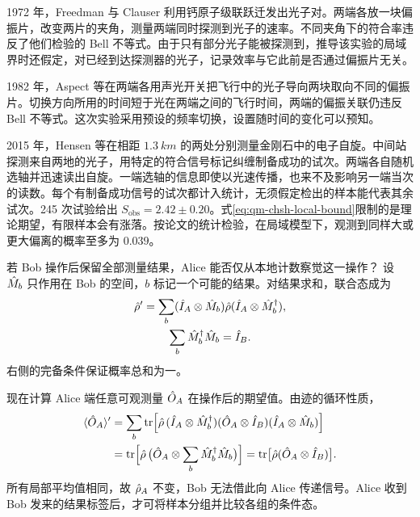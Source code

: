 \label{exp:qm-bell-1972}1972 年，Freedman 与 Clauser 利用钙原子级联跃迁发出光子对。两端各放一块偏振片，改变两片的夹角，测量两端同时探测到光子的速率。不同夹角下的符合率违反了他们检验的 Bell 不等式。由于只有部分光子能被探测到，推导该实验的局域界时还假定，对已经到达探测器的光子，记录效率与它此前是否通过偏振片无关\cite{belltests}。

\label{exp:qm-bell-1982}1982 年，Aspect 等在两端各用声光开关把飞行中的光子导向两块取向不同的偏振片。切换方向所用的时间短于光在两端之间的飞行时间，两端的偏振关联仍违反 Bell 不等式。这次实验采用预设的频率切换，设置随时间的变化可以预知\cite{belltests}。

\label{exp:qm-bell-2015}2015 年，Hensen 等在相距 $\qty{1.3}{km}$ 的两处分别测量金刚石中的电子自旋。中间站探测来自两地的光子，用特定的符合信号标记纠缠制备成功的试次。两端各自随机选轴并迅速读出自旋。一端选轴的信息即使以光速传播，也来不及影响另一端当次的读数。每个有制备成功信号的试次都计入统计，无须假定检出的样本能代表其余试次。245 次试验给出 $S_{\mathrm{obs}} = 2.42 \pm 0.20$。式\eqref{eq:qm-chsh-local-bound}限制的是理论期望，有限样本会有涨落。按论文的统计检验，在局域模型下，观测到同样大或更大偏离的概率至多为 $0.039$\cite{belltests}。

若 Bob 操作后保留全部测量结果，Alice 能否仅从本地计数察觉这一操作？
设 $\hat{M}_b$ 只作用在 Bob 的空间，$b$ 标记一个可能的结果。对结果求和，联合态成为
\begin{gather*}
    \hat{\rho}' = \sum_b(\hat{I}_A \otimes \hat{M}_b)\hat{\rho}(\hat{I}_A \otimes \hat{M}_b^\dagger),\\
    \sum_b\hat{M}_b^\dagger \hat{M}_b = \hat{I}_B .
\end{gather*}
右侧的完备条件保证概率总和为一。

现在计算 Alice 端任意可观测量 $\hat{O}_A$ 在操作后的期望值。由迹的循环性质，
\begin{equation}
    \begin{alignedat}{1}
        \langle\hat{O}_A\rangle' &= \sum_b
            \operatorname{tr}\Bigl[\hat{\rho}\,
            (\hat{I}_A \otimes \hat{M}_b^\dagger)(\hat{O}_A \otimes \hat{I}_B)
            (\hat{I}_A \otimes \hat{M}_b)\Bigr]\\
        &= \operatorname{tr}\Bigl[\hat{\rho}\,
            \bigl(\hat{O}_A \otimes \sum_b\hat{M}_b^\dagger \hat{M}_b\bigr)\Bigr]
            = \operatorname{tr}\bigl[\hat{\rho}(\hat{O}_A \otimes \hat{I}_B)\bigr].
    \end{alignedat}
\end{equation}
所有局部平均值相同，故 $\hat{\rho}_A$ 不变，Bob 无法借此向 Alice 传递信号。Alice 收到 Bob 发来的结果标签后，才可将样本分组并比较各组的条件态。

